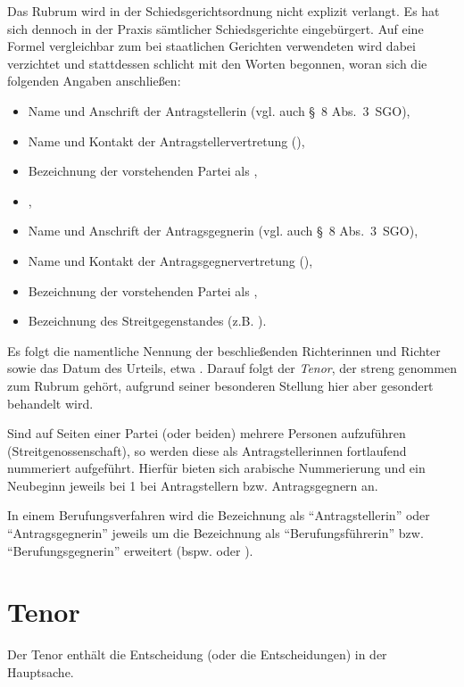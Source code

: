 Das Rubrum wird in der Schiedsgerichtsordnung nicht explizit verlangt.
Es hat sich dennoch in der Praxis sämtlicher Schiedsgerichte eingebürgert.
Auf eine Formel vergleichbar zum bei staatlichen Gerichten verwendeten  wird dabei verzichtet und stattdessen schlicht mit den Worten  begonnen, woran sich die folgenden Angaben anschließen:
\begin{itemize}
\item Name und Anschrift der Antragstellerin (vgl. auch \S~8 Abs.~3~SGO),
\item Name und Kontakt der Antragstellervertretung (),
\item Bezeichnung der vorstehenden Partei als ,
\item {},
\item Name und Anschrift der Antragsgegnerin (vgl. auch \S~8 Abs.~3~SGO),
\item Name und Kontakt der Antragsgegnervertretung (),
\item Bezeichnung der vorstehenden Partei als ,
\item Bezeichnung des Streitgegenstandes (z.B. ).
\end{itemize}

Es folgt die namentliche Nennung der beschließenden Richterinnen und Richter sowie das Datum des Urteils, etwa .
Darauf folgt der \emph{Tenor}, der streng genommen zum Rubrum gehört, aufgrund seiner besonderen Stellung hier aber gesondert behandelt wird.

Sind auf Seiten einer Partei (oder beiden) mehrere Personen aufzuführen (Streitgenossenschaft), so werden diese als Antragstellerinnen fortlaufend nummeriert aufgeführt.
Hierfür bieten sich arabische Nummerierung und ein Neubeginn jeweils bei 1 bei Antragstellern bzw. Antragsgegnern an.

In einem Berufungsverfahren wird die Bezeichnung als \enquote{Antragstellerin} oder \enquote{Antragsgegnerin} jeweils um die Bezeichnung als \enquote{Berufungsführerin} bzw. \enquote{Berufungsgegnerin} erweitert (bspw.  oder ).

\section{Tenor}
Der Tenor enthält die Entscheidung (oder die Entscheidungen) in der Hauptsache.

